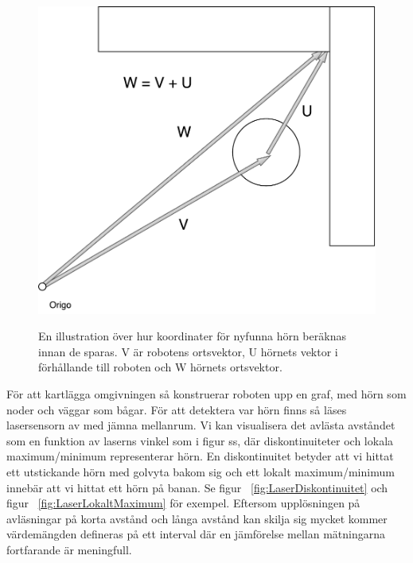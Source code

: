 \documentclass{article}
\begin{document}
\begin{figure}[H]
  \centering
  \includegraphics[scale=0.5]{Koordinatberakning} \\
  \caption{En illustration över hur koordinater för nyfunna hörn beräknas innan de sparas. V är robotens ortsvektor, U hörnets vektor i förhållande till roboten och W hörnets ortsvektor.}
  \label{fig:Koordinatberakning}
\end{figure}

För att kartlägga omgivningen så konstruerar roboten upp en graf, med hörn som noder och väggar som bågar. För att detektera var hörn finns så läses lasersensorn av med jämna mellanrum. Vi kan visualisera det avlästa avståndet som en funktion av laserns vinkel som i figur ss, där diskontinuiteter och lokala maximum/minimum representerar hörn. En diskontinuitet betyder att vi hittat ett utstickande hörn med golvyta bakom sig och ett lokalt maximum/minimum innebär att vi hittat ett hörn på banan. Se figur ~\ref{fig:LaserDiskontinuitet} och figur ~\ref{fig:LaserLokaltMaximum} för exempel. Eftersom upplösningen på avläsningar på korta avstånd och långa avstånd kan skilja sig mycket kommer värdemängden defineras på ett interval där en jämförelse mellan mätningarna fortfarande är meningfull.\newline\newline
\end{document}
